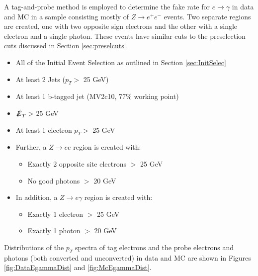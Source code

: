 A tag-and-probe method is employed to determine the fake rate for $e\rightarrow \gamma$ in data and MC in a sample consisting mostly of $Z\rightarrow e^+ e^-$ events.  Two separate regions are created, one with two opposite sign electrons and the other with a single electron and a single photon.  These events have similar cuts to the preselection cuts discussed in Section \ref{sec:preselcuts}.
\begin{itemize}
\item All of the Initial Event Selection as outlined in Section \ref{sec:InitSelec}
\item At least 2 Jets  ($p_T >$ 25 GeV) 
\item At least 1 b-tagged jet (MV2c10, 77\% working point)
\item $\slashed{E}_T >$ 25 GeV
\item At least 1 electron $p_T >$ 25 GeV
\item Further, a $Z\rightarrow ee$ region is created with:
	\begin{itemize}
	\item Exactly 2 opposite site electrons $>$ 25 GeV
	\item No good photons $>$ 20 GeV
	\end{itemize}
\item In addition, a $Z\rightarrow e\gamma$ region is created with:
	\begin{itemize}
	\item Exactly 1 electron $>$ 25 GeV
	\item Exactly 1 photon $>$ 20 GeV
	\end{itemize}
\end{itemize}

Distributions of the $p_T$ spectra of tag electrons and the probe electrons and photons (both converted and unconverted) in data and MC are shown in Figures \ref{fig:DataEgammaDist} and \ref{fig:McEgammaDist}.

